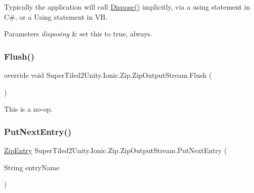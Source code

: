 Typically the application will call {\ttfamily \mbox{\hyperlink{class_super_tiled2_unity_1_1_ionic_1_1_zip_1_1_zip_output_stream_ac792f46e1b4cde3da0aa1eaf4ad28db4}{Dispose()}}} implicitly, via a {\ttfamily using} statement in C\#, or a {\ttfamily Using} statement in VB. 


\begin{DoxyParams}{Parameters}
{\em disposing} & set this to true, always.\\
\hline
\end{DoxyParams}
\mbox{\label{class_super_tiled2_unity_1_1_ionic_1_1_zip_1_1_zip_output_stream_aef2a751108f7c3ab281f544d33ab9355}} 
\subsubsection{\texorpdfstring{Flush()}{Flush()}}
{\footnotesize\ttfamily override void Super\+Tiled2\+Unity.\+Ionic.\+Zip.\+Zip\+Output\+Stream.\+Flush (\begin{DoxyParamCaption}{ }\end{DoxyParamCaption})}



This is a no-\/op. 

\mbox{\label{class_super_tiled2_unity_1_1_ionic_1_1_zip_1_1_zip_output_stream_a6328a636a423976167278aca779a3eca}} 
\subsubsection{\texorpdfstring{Put\+Next\+Entry()}{PutNextEntry()}}
{\footnotesize\ttfamily \mbox{\hyperlink{class_super_tiled2_unity_1_1_ionic_1_1_zip_1_1_zip_entry}{Zip\+Entry}} Super\+Tiled2\+Unity.\+Ionic.\+Zip.\+Zip\+Output\+Stream.\+Put\+Next\+Entry (\begin{DoxyParamCaption}\item[{String}]{entry\+Name }\end{DoxyParamCaption})}



